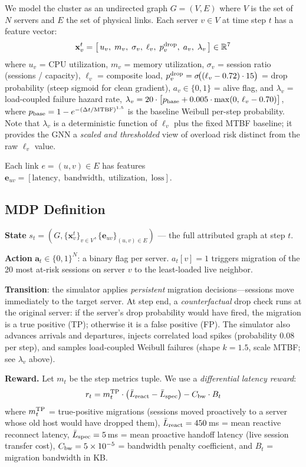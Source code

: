 \documentclass[review,1p]{elsarticle}
\theoremstyle{definition}
\begin{document}
We model the cluster as an undirected graph $G = (V, E)$ where $V$ is
the set of $N$ servers and $E$ the set of physical links.  Each server
$v \in V$ at time step $t$ has a feature vector:
\[
  \mathbf{x}_v^t = \bigl[\,
    u_v,\; m_v,\; \sigma_v,\; \ell_v,\; p_v^{\rm drop},\; a_v,\; \lambda_v
  \,\bigr] \in \mathbb{R}^7
\]
where $u_v$ = CPU utilization, $m_v$ = memory utilization,
$\sigma_v$ = session ratio (sessions / capacity), $\ell_v$ = composite
load, $p_v^{\rm drop} = \sigma\!\bigl((\ell_v - 0.72) \cdot 15\bigr)$
= drop probability (steep sigmoid for clean gradient),
$a_v \in \{0,1\}$ = alive flag, and $\lambda_v$ = load-coupled failure hazard rate,
$\lambda_v = 20\cdot\bigl[p_{\rm base} + 0.005\cdot\max(0,\,\ell_v - 0.70)\bigr]$,
where $p_{\rm base} = 1 - e^{-(\Delta t/\text{MTBF})^{1.5}}$
is the baseline Weibull per-step probability.  Note that $\lambda_v$ is
a deterministic function of $\ell_v$ plus the fixed MTBF baseline; it
provides the GNN a \emph{scaled and thresholded} view of overload risk
distinct from the raw $\ell_v$ value.

Each link $e = (u,v) \in E$ has features
$\mathbf{e}_{uv} = [\text{latency},\; \text{bandwidth},\; \text{utilization},\; \text{loss}]$.

\subsection{MDP Definition}

\textbf{State} $s_t = (G, \{\mathbf{x}_v^t\}_{v \in V}, \{\mathbf{e}_{uv}\}_{(u,v) \in E})$
--- the full attributed graph at step $t$.

\textbf{Action} $\mathbf{a}_t \in \{0,1\}^N$: a binary flag per server.
$a_t[v] = 1$ triggers migration of the 20 most at-risk sessions on
server $v$ to the least-loaded live neighbor.

\textbf{Transition}: the simulator applies \emph{persistent} migration
decisions---sessions move immediately to the target server.
At step end, a \emph{counterfactual} drop check runs at the original server:
if the server's drop probability would have fired, the migration is a
true positive (TP); otherwise it is a false positive (FP).
The simulator also advances arrivals and departures, injects correlated
load spikes (probability 0.08 per step), and samples load-coupled Weibull
failures (shape $k{=}1.5$, scale MTBF; see $\lambda_v$ above).

\textbf{Reward.} Let $m_t$ be the step metrics tuple.  We use a
\emph{differential latency reward}:
\begin{equation}
  r_t = m_t^{\rm TP} \cdot \bigl(\bar{L}_{\rm react} - \bar{L}_{\rm spec}\bigr)
        - C_{\rm bw} \cdot B_t
  \label{eq:reward}
\end{equation}
where $m_t^{\rm TP}$ = true-positive migrations (sessions moved proactively
to a server whose old host would have dropped them), $\bar{L}_{\rm react} = 450$\,ms = mean reactive
reconnect latency, $\bar{L}_{\rm spec} = 5$\,ms = mean proactive handoff
latency (live session transfer cost), $C_{\rm bw} = 5 \times 10^{-5}$ = bandwidth
penalty coefficient, and $B_t$ = migration bandwidth in KB.
\end{document}
